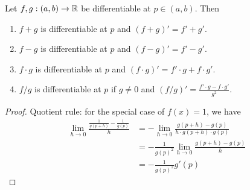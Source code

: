 \documentclass[12pt]{article}
\begin{document}
\begin{thm} \label{thm:dv algebra}
    Let $f, g : (a, b) \to \mathbb{R}$ be differentiable at $p \in (a, b)$. Then
    \begin{enumerate}[label=(\alph*)]
        \item $f + g$ is differentiable at $p$ and $(f + g)' = f' + g'$.
        \item $f - g$ is differentiable at $p$ and $(f - g)' = f' - g'$.
        \item $f \cdot g$ is differentiable at $p$ and $(f \cdot g)' = f' \cdot g + f \cdot g'$.
        \item $f / g$ is differentiable at $p$ if $g \neq 0$ and $(f / g)' = \frac{f' \cdot g - f \cdot g'}{g^2}$.
    \end{enumerate}
\end{thm}
\begin{proof}
    Quotient rule: for the special case of $f(x) = 1$, we have
    \begin{align*}
        \lim_{h \to 0} \frac{\frac{1}{g(p + h)} - \frac{1}{g(p)}}{h} &= - \lim_{h \to 0} \frac{g(p + h) - g(p)}{h \cdot g(p + h) \cdot g(p)} \\
        &= - \frac{1}{g(p)^{2}} \lim_{h \to 0} \frac{g(p + h) - g(p)}{h} \\
        &= - \frac{1}{g(p)^{2}} g'(p) \tag{exists}
    \end{align*}
\end{proof}
\end{document}
